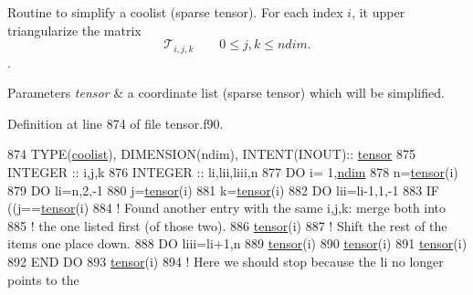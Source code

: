Routine to simplify a coolist (sparse tensor). For each index $i$, it upper triangularize the matrix \[\mathcal{T}_{i,j,k} \qquad 0 \leq j,k \leq ndim.\]. 


\begin{DoxyParams}{Parameters}
{\em tensor} & a coordinate list (sparse tensor) which will be simplified. \\
\hline
\end{DoxyParams}


Definition at line 874 of file tensor.\+f90.


\begin{DoxyCode}
874    \textcolor{keywordtype}{TYPE}(\hyperlink{structtensor_1_1coolist}{coolist}), \textcolor{keywordtype}{DIMENSION(ndim)}, \textcolor{keywordtype}{INTENT(INOUT)}:: \hyperlink{namespacetensor}{tensor}
875    \textcolor{keywordtype}{INTEGER} :: i,j,k
876    \textcolor{keywordtype}{INTEGER} :: li,lii,liii,n
877    \textcolor{keywordflow}{DO} i= 1,\hyperlink{namespaceparams_a2323fe1773f086e20c14f266351c482b}{ndim}
878       n=\hyperlink{namespacetensor}{tensor}(i)%
879       \textcolor{keywordflow}{DO} li=n,2,-1
880          j=\hyperlink{namespacetensor}{tensor}(i)%
881          k=\hyperlink{namespacetensor}{tensor}(i)%
882          \textcolor{keywordflow}{DO} lii=li-1,1,-1
883             \textcolor{keywordflow}{IF} ((j==\hyperlink{namespacetensor}{tensor}(i)%
884                \textcolor{comment}{! Found another entry with the same i,j,k: merge both into}
885                \textcolor{comment}{! the one listed first (of those two). }
886                \hyperlink{namespacetensor}{tensor}(i)%
887                \textcolor{comment}{! Shift the rest of the items one place down.}
888                \textcolor{keywordflow}{DO} liii=li+1,n
889                   \hyperlink{namespacetensor}{tensor}(i)%
890                   \hyperlink{namespacetensor}{tensor}(i)%
891                   \hyperlink{namespacetensor}{tensor}(i)%
892 \textcolor{keywordflow}{               END DO}
893                \hyperlink{namespacetensor}{tensor}(i)%
894                \textcolor{comment}{! Here we should stop because the li no longer points to the}

\end{DoxyCode}
